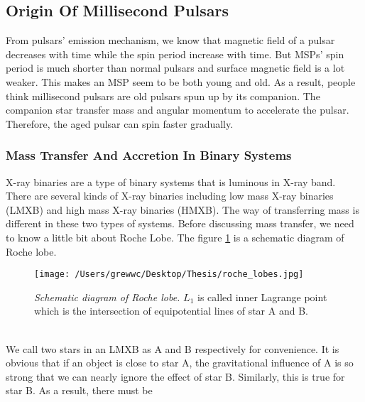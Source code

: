 \documentclass[12pt]{report}
\begin{document}
        \subsection{Origin Of Millisecond Pulsars}
            From pulsars' emission mechanism, we know that magnetic field of a pulsar decreases with time while 
            the spin period increase with time. But MSPs' spin period is much shorter than normal pulsars and 
            surface magnetic field is a lot weaker. This makes an MSP seem to be both young and old. As a result,
            people think millisecond pulsars are old pulsars spun up by its companion. The companion star transfer
            mass and angular momentum to accelerate the pulsar. Therefore, the aged pulsar can spin faster 
            gradually. 
            \subsubsection{Mass Transfer And Accretion In Binary Systems}
                X-ray binaries are a type of binary systems that is luminous in X-ray band. There are several kinds 
                of X-ray binaries including low mass X-ray binaries (LMXB) and high mass X-ray binaries (HMXB). 
                The way of transferring mass is different in these two types of systems. Before discussing mass 
                transfer, we need to know a little bit about Roche Lobe. The figure \ref{fig:roche lobe} is a 
                schematic diagram of Roche lobe.
                \begin{figure}[h]
                  \centering
                  \texttt{[image: /Users/grewwc/Desktop/Thesis/roche\_lobes.jpg]}
                  \begin{minipage}{0.8\textwidth}
                  \caption{\footnotesize \textit{Schematic diagram of Roche lobe.} $L_{1}$ is called inner 
                            Lagrange point which is the intersection of equipotential lines of star A 
                            and B.}
                  \label{fig:roche lobe}
                  \end{minipage}
                \end{figure}\\
                \indent  We call two stars in an LMXB as A and B respectively for convenience. It is obvious 
                that if an object is close to star A, the gravitational influence of A is so strong that we can 
                nearly ignore the effect of star B. Similarly, this is true for star B. As a result, there must be 
\end{document}
